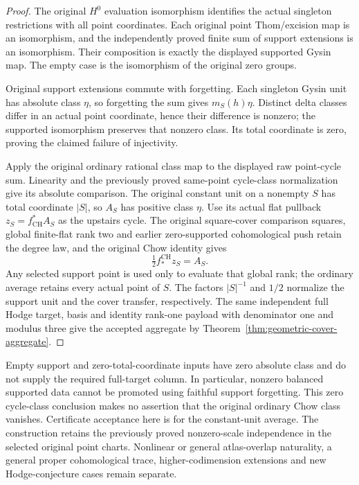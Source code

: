 \documentclass[11pt]{article}
\theoremstyle{definition}
\theoremstyle{remark}
\DeclareMathOperator{\CH}{CH}
\begin{document}
\begin{proof}
The original \(H^0\) evaluation isomorphism identifies the actual
singleton restrictions with all point coordinates. Each original
point Thom/excision map is an isomorphism, and the independently
proved finite sum of support extensions is an isomorphism. Their
composition is exactly the displayed supported Gysin map. The empty
case is the isomorphism of the original zero groups.

Original support extensions commute with forgetting. Each singleton
Gysin unit has absolute class \(\eta\), so forgetting the sum gives
\(m_S(h)\eta\). Distinct delta classes differ in an actual point
coordinate, hence their difference is nonzero; the supported
isomorphism preserves that nonzero class. Its total coordinate is
zero, proving the claimed failure of injectivity.

Apply the original ordinary rational class map to the displayed raw
point-cycle sum. Linearity and the previously proved same-point
cycle-class normalization give its absolute comparison. The original
constant unit on a nonempty \(S\) has total coordinate \(|S|\),
so \(A_S\) has positive class \(\eta\). Use its actual flat
pullback \(z_S=f_{\CH}^*A_S\) as the upstairs cycle. The original
square-cover comparison squares, global finite-flat rank two and
earlier zero-supported cohomological push retain the degree law, and
the original Chow identity gives
\[
 \tfrac12 f_*^{\CH}z_S=A_S.
\]
Any selected support point is used only to evaluate that global rank;
the ordinary average retains every actual point of \(S\).
The factors \(|S|^{-1}\) and \(1/2\) normalize the support unit and
the cover transfer, respectively.
The same independent full Hodge target, basis and identity rank-one
payload with denominator one and modulus three give the accepted
aggregate by Theorem~\ref{thm:geometric-cover-aggregate}.
\end{proof}

Empty support and zero-total-coordinate inputs have zero absolute
class and do not supply the required full-target column. In
particular, nonzero balanced supported data cannot be promoted using
faithful support forgetting. This zero cycle-class conclusion makes
no assertion that the original ordinary Chow class vanishes.
Certificate acceptance here is for the constant-unit average.
The construction retains the previously
proved nonzero-scale independence in the selected original point
charts. Nonlinear or general atlas-overlap naturality, a general
proper cohomological trace, higher-codimension extensions and new
Hodge-conjecture cases remain separate.
\end{document}
